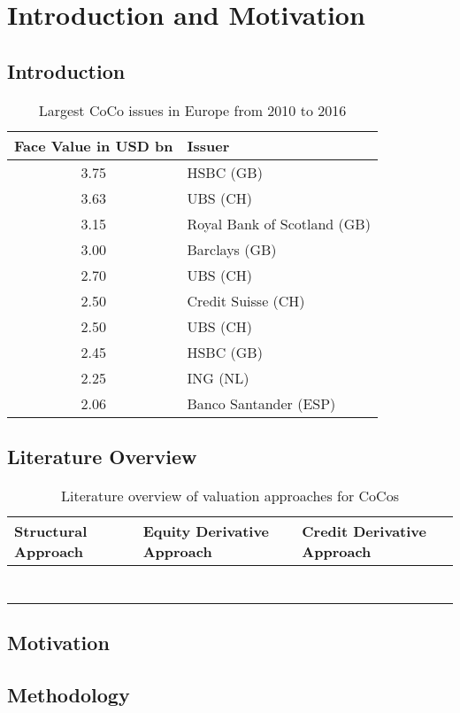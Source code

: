 \chapter{Introduction and Motivation}

\section{Introduction}

\begin{table}[h]
	\centering
	\begin{tabular}{cl}
		\toprule
			Face Value in USD bn & Issuer \\
		\midrule
			3.75 & HSBC (GB) \\
			3.63 & UBS (CH) \\
			3.15 & Royal Bank of Scotland (GB) \\
			3.00 & Barclays (GB) \\
			2.70 & UBS (CH) \\
			2.50 & Credit Suisse (CH) \\
			2.50 & UBS (CH) \\
			2.45 & HSBC (GB) \\
			2.25 & ING (NL) \\
			2.06 & Banco Santander (ESP)\\
		\bottomrule
	\end{tabular}
	\caption[Largest CoCo issues in Europe]{Largest CoCo issues in Europe from 2010 to 2016 \citep{schmuddel2016}}
\end{table}

\section{Literature Overview}

\begin{table}[H]
	\setlength{\extrarowheight}{2.5pt}
	\centering
	\begin{tabular}{>{\centering\arraybackslash}p{4cm}>{\centering\arraybackslash}p{4cm}>{\centering\arraybackslash}p{4cm}}
		\toprule
			Structural Approach & Equity Derivative Approach & Credit Derivative Approach \\
		\midrule
			\citet{pennacchi2010structural} & \citet{de2011pricing} &  \citet{de2011pricing}\\
			\citet{glasserman2012contingent}  & \citet{henriques2011making} & \\
			\citet{madan2011conic}  &  &  \\
			\citet{albul2010contingent}  &  &  \\
			\citet{sundaresan2015design}  &  &  \\
			\citet{hilscher2014bank}  &  &  \\
			\citet{buergi2013pricing} &  &  \\
		\bottomrule
	\end{tabular}
	\caption[Literature overview of valuation approaches for CoCos] {Literature overview of valuation approaches for CoCos \citep{erismann2015pricing}}
\end{table}

\section{Motivation}

\section{Methodology}


